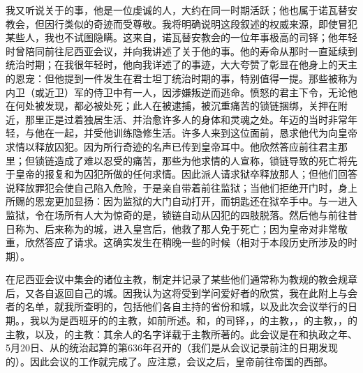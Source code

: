 我又听说关于的事，他是一位虔诚的人，大约在同一时期活跃；他也属于诺瓦替安教会，但因行类似的奇迹而受尊敬。我将明确说明这段叙述的权威来源，即使冒犯某些人，我也不试图隐瞒。这来自，诺瓦替安教会的一位年事极高的司铎；他年轻时曾陪同前往尼西亚会议，并向我讲述了关于他的事。他的寿命从那时一直延续到统治时期；在我很年轻时，他向我详述了的事迹，大大夸赞了彰显在他身上的天主的恩宠：但他提到一件发生在君士坦丁统治时期的事，特别值得一提。那些被称为内卫（或近卫）军的侍卫中有一人，因涉嫌叛逆而逃命。愤怒的君主下令，无论他在何处被发现，都必被处死；此人在被逮捕，被沉重痛苦的锁链捆绑，关押在附近，那里正是过着独居生活、并治愈许多人的身体和灵魂之处。年迈的当时非常年轻，与他在一起，并受他训练隐修生活。许多人来到这位面前，恳求他代为向皇帝求情以释放囚犯。因为所行奇迹的名声已传到皇帝耳中。他欣然答应前往君主那里；但锁链造成了难以忍受的痛苦，那些为他求情的人宣称，锁链导致的死亡将先于皇帝的报复和为囚犯所做的任何求情。因此派人请求狱卒释放那人；但他们回答说释放罪犯会使自己陷入危险，于是亲自带着前往监狱；当他们拒绝开门时，身上所赐的恩宠更加显扬：因为监狱的大门自动打开，而钥匙还在狱卒手中。与一进入监狱，令在场所有人大为惊奇的是，锁链自动从囚犯的四肢脱落。然后他与前往昔日称为、后来称为的城，进入皇宫后，他救了那人免于死亡；因为皇帝对非常敬重，欣然答应了请求。这确实发生在稍晚一些的时候（相对于本段历史所涉及的时期）。\par

在尼西亚会议中集会的诸位主教，制定并记录了某些他们通常称为教规的教会规章后，又各自返回自己的城。因我认为这将受到学问爱好者的欣赏，我在此附上与会者的名单，就我所查明的，包括他们各自主持的省份和城，以及此次会议举行的日期。，我以为是西班牙的的主教，如前所述。和，的司铎，，的主教，，的主教，，的主教，以及，的主教：其余人的名字详载于主教所著的。此会议是在和执政之年、5月20日、从的统治起算的第636年召开的（我们是从会议记录前注的日期发现的）。因此会议的工作就完成了。应注意，会议之后，皇帝前往帝国的西部。\par

